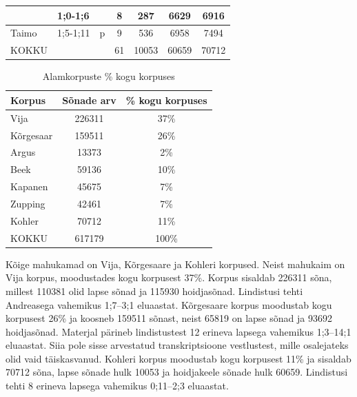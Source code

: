 \documentclass[12pt]{article}
\begin{document}
\begin{table}[H]
{\begin{tabular}{|l|l|c|c|c|c|c|}
                        & 1;0-1;6   &                           & 8                               & 287                              & 6629                              & 6916                       \\ \hline
Taimo                   & 1;5-1;11  & p                         & 9                               & 536                              & 6958                              & 7494                       \\ \hline\hline
KOKKU                   & \multicolumn{2}{l|}{}                 & 61                              & 10053                            & 60659                             & 70712                      \\ \hline
\end{tabular}}
\end{table}

\begin{table}[H]
\centering
\caption{Alamkorpuste \% kogu korpuses}
\begin{tabular}{|l|c|c|}
\hline
Korpus    & \multicolumn{1}{l|}{Sõnade arv} & \multicolumn{1}{l|}{\% kogu korpuses} \\ \hline\hline
Vija      & 226311                          & 37\%                                  \\ \hline
Kõrgesaar & 159511                          & 26\%                                  \\ \hline
Argus     & 13373                           & 2\%                                   \\ \hline
Beek      & 59136                           & 10\%                                  \\ \hline
Kapanen   & 45675                           & 7\%                                   \\ \hline
Zupping   & 42461                           & 7\%                                   \\ \hline
Kohler    & 70712                           & 11\%                                  \\ \hline
KOKKU     & 617179                          & 100\%                                 \\ \hline\hline
\end{tabular}
\end{table}

Kõige mahukamad on Vija, Kõrgesaare ja Kohleri korpused. Neist mahukaim on Vija korpus, moodustades kogu korpusest 37\%. Korpus sisaldab 226311 sõna, millest 110381 olid lapse sõnad ja 115930 hoidjasõnad. Lindistusi tehti Andreasega vahemikus 1;7--3;1 eluaastat. Kõrgesaare korpus moodustab kogu korpusest 26\% ja koosneb 159511 sõnast, neist 65819 on lapse sõnad ja 93692 hoidjasõnad. Materjal pärineb lindistustest 12 erineva lapsega vahemikus 1;3--14;1 eluaastat. Siia pole sisse arvestatud transkriptsioone vestlustest, mille osalejateks olid vaid täiskasvanud. Kohleri korpus moodustab kogu korpusest 11\% ja sisaldab 70712 sõna, lapse sõnade hulk 10053 ja hoidjakeele sõnade hulk 60659. Lindistusi tehti 8 erineva lapsega vahemikus 0;11--2;3 eluaastat.
\end{document}
